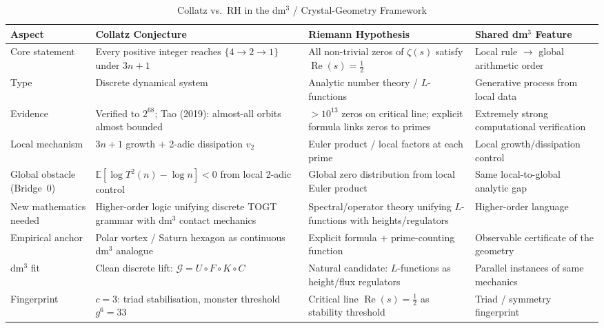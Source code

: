 \begin{table}[ht]
\centering
\caption{Collatz vs.\ RH in the dm$^3$ / Crystal-Geometry Framework}
\label{tab:collatz_rh}
\renewcommand{\arraystretch}{1.35}
\begin{tabular}{@{}p{2.8cm}p{4.2cm}p{4.2cm}p{4.6cm}@{}}
\toprule
\textbf{Aspect} & \textbf{Collatz Conjecture} & \textbf{Riemann Hypothesis} & \textbf{Shared dm$^3$ Feature} \\
\midrule
Core statement
  & Every positive integer reaches $\{4\!\to\!2\!\to\!1\}$ under $3n+1$
  & All non-trivial zeros of $\zeta(s)$ satisfy $\operatorname{Re}(s)=\tfrac{1}{2}$
  & Local rule $\to$ global arithmetic order \\
Type
  & Discrete dynamical system
  & Analytic number theory / $L$-functions
  & Generative process from local data \\
Evidence
  & Verified to $2^{68}$; Tao (2019): almost-all orbits almost bounded
  & $>10^{13}$ zeros on critical line; explicit formula links zeros to primes
  & Extremely strong computational verification \\
Local mechanism
  & $3n+1$ growth $+$ 2-adic dissipation $v_2$
  & Euler product / local factors at each prime
  & Local growth/dissipation control \\
Global obstacle (Bridge~0)
  & $\mathbb{E}[\log T^2(n)-\log n]<0$ from local 2-adic control
  & Global zero distribution from local Euler product
  & Same local-to-global analytic gap \\
New mathematics needed
  & Higher-order logic unifying discrete TOGT grammar with dm$^3$ contact mechanics
  & Spectral/operator theory unifying $L$-functions with heights/regulators
  & Higher-order language \\
Empirical anchor
  & Polar vortex / Saturn hexagon as continuous dm$^3$ analogue
  & Explicit formula $+$ prime-counting function
  & Observable certificate of the geometry \\
dm$^3$ fit
  & Clean discrete lift: $\mathcal{G}=U\circ F\circ K\circ C$
  & Natural candidate: $L$-functions as height/flux regulators
  & Parallel instances of same mechanics \\
Fingerprint
  & $c=3$: triad stabilisation, monster threshold $g^6=33$
  & Critical line $\operatorname{Re}(s)=\tfrac{1}{2}$ as stability threshold
  & Triad / symmetry fingerprint \\
\bottomrule
\end{tabular}
\end{table}

